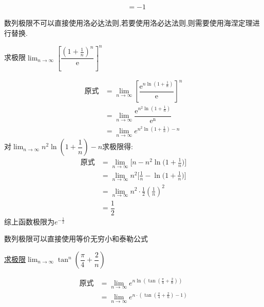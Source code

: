 \documentclass[8pt a4paper, oneside, UTF8]{ctexbook}
\begin{document}
\begin{sloppypar}
\begin{solution}
\begin{align*}
                      & = -1
        \end{align*}
    \end{solution}
    \begin{note}
        数列极限不可以直接使用洛必达法则,若要使用洛必达法则,则需要使用海涅定理进行替换.
    \end{note}
    \begin{problem}
    求极限$\lim_{n\to\infty}\left[\dfrac{\left(1+\frac1n\right)^n}{\mathrm{e}}\right]^n$
    \end{problem}
    \begin{solution}
        \begin{align*}
            \text{原式} & = \lim_{n\to\infty}\left[\dfrac{\mathrm{e}^{n\ln\left(1+\frac1n\right)}}{\mathrm{e}}\right]^n \\
                      & = \lim_{n\to\infty}\dfrac{\mathrm{e}^{n^2\ln\left(1+\frac1n\right)}}{\mathrm{e^n}}            \\
                      & =\lim_{n \to \infty} e^{n^2\ln(1+\frac{1}{n})-n}
        \end{align*}
        对$\lim_{n \to \infty} n^2\ln(1+\dfrac{1}{n})-n$求极限得:
        \begin{align*}
            \text{原式} & = \lim_{n\to\infty}\biggl[n-n^2\ln\biggl(1+\frac{1}{n}\biggr)\biggr]            \\
                      & =  \lim_{n\to\infty}n^2\biggl[\frac{1}{n}-\ln\biggl(1+\frac{1}{n}\biggr)\biggr] \\
                      & = \lim_{n\to\infty}n^2\cdot\frac12\left(\frac1n\right)^2                        \\
                      & = \dfrac{1}{2}
        \end{align*}
        综上函数极限为$e^{-\frac{1}{2}}$
    \end{solution}
    \begin{note}
        数列极限可以直接使用等价无穷小和泰勒公式
    \end{note}
    \begin{problem}
    \uline{求极限}$\lim_{n\to\infty}\tan^n\left(\dfrac\pi4+\dfrac2n\right)$
    \end{problem}
    \begin{solution}
        \begin{align*}
            \text{原式} & = \lim_{n\to\infty} e^{n \ln(\tan(\frac{\pi}{4}+\frac{2}{n}))}                                                                     \\
                      & =  \lim_{n\to\infty}e^{n\cdot (\tan(\frac{\pi}{4}+\frac{2}{n}) -1)}                                                                \\

\end{align*}
\end{solution}
\end{sloppypar}
\end{document}
